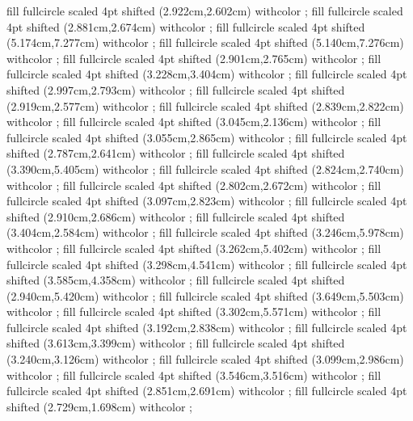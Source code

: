 {fill fullcircle scaled 4pt shifted (2.922cm,2.602cm) withcolor ;
fill fullcircle scaled 4pt shifted (2.881cm,2.674cm) withcolor ;
fill fullcircle scaled 4pt shifted (5.174cm,7.277cm) withcolor ;
fill fullcircle scaled 4pt shifted (5.140cm,7.276cm) withcolor ;
fill fullcircle scaled 4pt shifted (2.901cm,2.765cm) withcolor ;
fill fullcircle scaled 4pt shifted (3.228cm,3.404cm) withcolor ;
fill fullcircle scaled 4pt shifted (2.997cm,2.793cm) withcolor ;
fill fullcircle scaled 4pt shifted (2.919cm,2.577cm) withcolor ;
fill fullcircle scaled 4pt shifted (2.839cm,2.822cm) withcolor ;
fill fullcircle scaled 4pt shifted (3.045cm,2.136cm) withcolor ;
fill fullcircle scaled 4pt shifted (3.055cm,2.865cm) withcolor ;
fill fullcircle scaled 4pt shifted (2.787cm,2.641cm) withcolor ;
fill fullcircle scaled 4pt shifted (3.390cm,5.405cm) withcolor ;
fill fullcircle scaled 4pt shifted (2.824cm,2.740cm) withcolor ;
fill fullcircle scaled 4pt shifted (2.802cm,2.672cm) withcolor ;
fill fullcircle scaled 4pt shifted (3.097cm,2.823cm) withcolor ;
fill fullcircle scaled 4pt shifted (2.910cm,2.686cm) withcolor ;
fill fullcircle scaled 4pt shifted (3.404cm,2.584cm) withcolor ;
fill fullcircle scaled 4pt shifted (3.246cm,5.978cm) withcolor ;
fill fullcircle scaled 4pt shifted (3.262cm,5.402cm) withcolor ;
fill fullcircle scaled 4pt shifted (3.298cm,4.541cm) withcolor ;
fill fullcircle scaled 4pt shifted (3.585cm,4.358cm) withcolor ;
fill fullcircle scaled 4pt shifted (2.940cm,5.420cm) withcolor ;
fill fullcircle scaled 4pt shifted (3.649cm,5.503cm) withcolor ;
fill fullcircle scaled 4pt shifted (3.302cm,5.571cm) withcolor ;
fill fullcircle scaled 4pt shifted (3.192cm,2.838cm) withcolor ;
fill fullcircle scaled 4pt shifted (3.613cm,3.399cm) withcolor ;
fill fullcircle scaled 4pt shifted (3.240cm,3.126cm) withcolor ;
fill fullcircle scaled 4pt shifted (3.099cm,2.986cm) withcolor ;
fill fullcircle scaled 4pt shifted (3.546cm,3.516cm) withcolor ;
fill fullcircle scaled 4pt shifted (2.851cm,2.691cm) withcolor ;
fill fullcircle scaled 4pt shifted (2.729cm,1.698cm) withcolor ;
}

